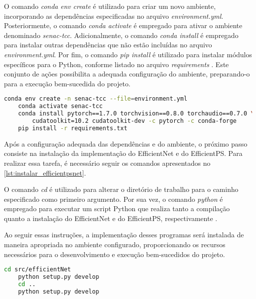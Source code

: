 O comando \emph{conda env create} é utilizado para criar um novo ambiente, incorporando as dependências especificadas no arquivo \emph{environment.yml}. Posteriormente, o comando \emph{conda activate} é empregado para ativar o ambiente denominado \emph{senac-tcc}. Adicionalmente, o comando \emph{conda install} é empregado para instalar outras dependências que não estão incluídas no arquivo \emph{environment.yml}. Por fim, o comando \emph{pip install} é utilizado para instalar módulos específicos para o Python, conforme listado no arquivo \emph{requirements} \cite{conda_env_create,conda_deep_dives_activation,conda_install,pip_install}. Este conjunto de ações possibilita a adequada configuração do ambiente, preparando-o para a execução bem-sucedida do projeto.

\begin{lstlisting}[caption={Trecho com instruções para instalação de dependências utilizando conda e pip \cite{efficientpsGit}},label={lst:conda_dependencias},language=Bash,showstringspaces=false]
    conda env create -n senac-tcc --file=environment.yml
    conda activate senac-tcc
    conda install pytorch==1.7.0 torchvision==0.8.0 torchaudio==0.7.0 \
        cudatoolkit=10.2 cudatoolkit-dev -c pytorch -c conda-forge
    pip install -r requirements.txt
\end{lstlisting}

Após a configuração adequada das dependências e do ambiente, o próximo passo consiste na instalação da implementação do EfficientNet e do EfficientPS. Para realizar essa tarefa, é necessário seguir os comandos apresentados no \cref{lst:instalar_efficientpsnet}.

O comando \emph{cd} é utilizado para alterar o diretório de trabalho para o caminho especificado como primeiro argumento. Por sua vez, o comando \emph{python} é empregado para executar um script Python que realiza tanto a compilação quanto a instalação do EfficientNet e do EfficientPS, respectivamente \cite{cd_3tcl,efficientpsGit}.

Ao seguir essas instruções, a implementação desses programas será instalada de maneira apropriada no ambiente configurado, proporcionando os recursos necessários para o desenvolvimento e execução bem-sucedidos do projeto.

\begin{lstlisting}[caption={Trecho de código com comandos para instalação da EfficientNet e EfficientPS \cite{efficientpsGit}},label={lst:instalar_efficientpsnet},language=Bash,showstringspaces=false]
    cd src/efficientNet
    python setup.py develop
    cd ..
    python setup.py develop
\end{lstlisting}

